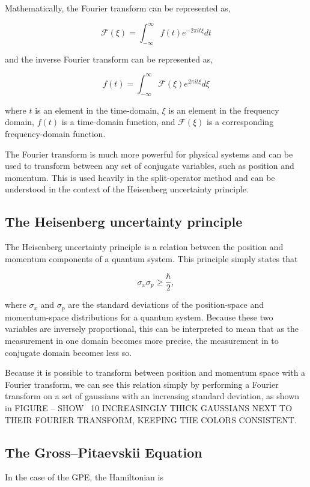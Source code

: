 Mathematically, the Fourier transform can be represented as,

$$
\mathcal{F}(\xi) = \int_{-\infty}^{\infty}f(t)e^{-2\pi i t \xi}dt
$$

and the inverse Fourier transform can be represented as,

$$
f(t) = \int_{-\infty}^{\infty}\mathcal{F}(\xi)e^{2\pi i t \xi}d\xi
$$

where $t$ is an element in the time-domain, $\xi$ is an element in the frequency domain, $f(t)$ is a time-domain function, and $\mathcal{F}(\xi)$ is a corresponding frequency-domain function.

The Fourier transform is much more powerful for physical systems and can be used to transform between any set of conjugate variables, such as position and momentum.
This is used heavily in the split-operator method and can be understood in the context of the Heisenberg uncertainty principle.

\subsection{The Heisenberg uncertainty principle}

The Heisenberg uncertainty principle is a relation between the position and momentum components of a quantum system.
This principle simply states that

$$
\sigma_x \sigma_p \geq \frac{\hbar}{2},
$$

where $\sigma_x$ and $\sigma_p$ are the standard deviations of the position-space and momentum-space distributions for a quantum system.
Because these two variables are inversely proportional, this can be interpreted to mean that as the measurement in one domain becomes more precise, the measurement in to conjugate domain becomes less so.

Because it is possible to transform between position and momentum space with a Fourier transform, we can see this relation simply by performing a Fourier transform on a set of gaussians with an increasing standard deviation, as shown in FIGURE -- SHOW ~10 INCREASINGLY THICK GAUSSIANS NEXT TO THEIR FOURIER TRANSFORM, KEEPING THE COLORS CONSISTENT.

\subsection{The Gross--Pitaevskii Equation}

In the case of the GPE, the Hamiltonian is

